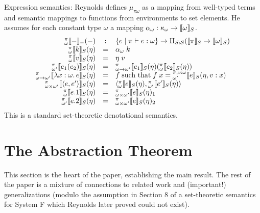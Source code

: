 \documentclass{article}
\begin{document}
Expression semantics: Reynolds defines $\mu_{\pi\omega}$ as a mapping from well-typed terms and
semantic mappings to functions from environments to set elements.  He assumes for each constant type
$\omega$ a mapping $\alpha_\omega : \kappa_\omega \rightarrow \llbracket \omega \rrbracket_{S}$.
\newcommand{\edenote}[5]{\ensuremath{{}^{#1}_{#2}\llbracket #3\rrbracket_{#4}(#5)}}
\[
    \begin{array}{rcl}
        \edenote{\pi}{\omega}{-}{-}{-} & : & \{ e \mid \pi\vdash e : \omega \} \rightarrow
        \Pi_{S:\mathcal{S}} (\denote{\pi}{S}\rightarrow\denote{\omega}{S})\\
        \edenote{\pi}{\omega}{k}{S}{\eta} & = & \alpha_\omega\;k\\
        \edenote{\pi}{\omega}{v}{S}{\eta} & = & \eta\;v\\
        \edenote{\pi}{\omega'}{e_1(e_2)}{S}{\eta} & = &
            \edenote{\pi}{\omega\rightarrow\omega'}{e_1}{S}{\eta}(\edenote{\pi}{\omega}{e_2}{S}{\eta})\\
        \edenote{\pi}{\omega\rightarrow\omega'}{\lambda x:\omega\ldotp e}{S}{\eta} & = & f \;\textrm{such that}\;
            f\;x=\edenote{\pi,v:\omega}{\omega'}{e}{S}{\eta,v:x}
        \\
        \edenote{\pi}{\omega\times\omega'}{\langle e,e' \rangle}{S}{\eta} & = & 
            \langle
            \edenote{\pi}{\omega}{e}{S}{\eta}
            ,
            \edenote{\pi}{\omega'}{e'}{S}{\eta}
            \rangle
        \\
        \edenote{\pi}{\omega}{e.1}{S}{\eta} & = & \edenote{\pi}{\omega\times\omega'}{e}{S}{\eta}_1\\
        \edenote{\pi}{\omega'}{e.2}{S}{\eta} & = & \edenote{\pi}{\omega\times\omega'}{e}{S}{\eta}_2\\
    \end{array}
\]
This is a standard set-theoretic denotational semantics.

\section*{The Abstraction Theorem}
This section is the heart of the paper, establishing the main result.  The rest of the paper is a
mixture of connections to related work and (important!) generalizations (modulo the assumption in
Section 8 of a set-theoretic semantics for System F which Reynolds later proved could not exist).

\newcommand{\rel}[2]{\ensuremath{\mathsf{Rel}(#1, #2)}}
\end{document}
